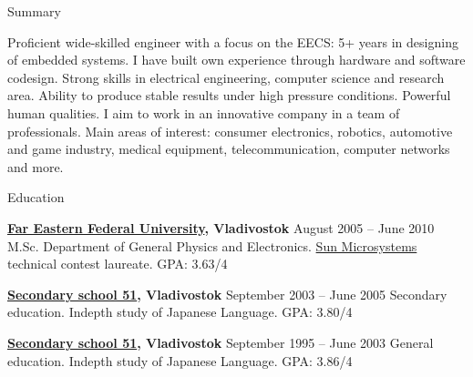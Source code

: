 \documentclass{template}
\begin{document}

\begin{rSection}{Summary}

Proficient wide-skilled engineer with a focus on the EECS: 5+ years in designing of embedded systems. I have built own experience
through hardware and software codesign. Strong skills in electrical engineering, computer science and research area.  Ability to
produce stable results under high pressure conditions. Powerful human qualities. I aim to work in an innovative company in a team
of professionals. Main areas of interest: consumer electronics, robotics, automotive and game industry, medical equipment,
telecommunication, computer networks and more.

\end{rSection}


\begin{rSection}{Education}

{\bf \href{http://wwwold.dvfu.ru/en/web/fefu/}{Far Eastern Federal University}, Vladivostok} \hfill {August 2005 -- June 2010} \newline
M.Sc. Department of General Physics and Electronics. \newline
\href{http://www.oracle.com}{Sun Microsystems} technical contest laureate. \newline 
GPA: 3.63/4

{\bf \href{ http://www.school51.pupils.ru }{Secondary school 51}, Vladivostok} \hfill {September 2003 -- June 2005} \newline
Secondary education. \newline
Indepth study of Japanese Language. \newline
GPA: 3.80/4

{\bf \href{http://www.school51.pupils.ru}{Secondary school 51}, Vladivostok} \hfill {September 1995 -- June 2003} \newline
General education. \newline
Indepth study of Japanese Language. \newline
GPA: 3.86/4

\end{rSection}

\end{document}
